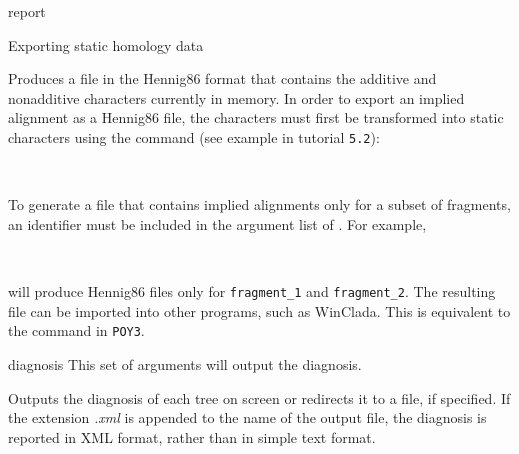 \begin{command}{report}{}
\begin{arguments}
\begin{argumentgroup}{Exporting static homology data}
                {Produces a file in the Hennig86 format that contains the
                additive and nonadditive characters currently in memory.  In
                order to export an implied alignment as a Hennig86 file, the
                characters must first be transformed into static characters
                using the  command (see example in tutorial \texttt{5.2}): 
                \begin{flushleft}
                     \\
                \end{flushleft}}
                {}
	\begin{statement}
	      To generate a file that contains implied
                alignments only for a subset of fragments, an identifier must be
                included in the argument list of . For
                example, 
                \begin{flushleft}
                 \\
                \end{flushleft}
                will produce Hennig86 files only for
                \texttt{fragment\_1} and \texttt {fragment\_2}. The resulting file can be imported into other programs,
                such as WinClada.  This is equivalent to the
                 command in \texttt{POY3}.
	\end{statement}
	
		\end{argumentgroup}

		\begin{argumentgroup}{diagnosis}
			{This set of arguments will output the diagnosis.} 

                {Outputs the diagnosis of each tree on screen or redirects it to a file, if
                specified. If the extension \emph{.xml} is appended to the name of the
                output file, the diagnosis is reported in XML format, rather than in
                simple text format.} 
                {}

		\end{argumentgroup} 


\end{arguments}
\end{command}
